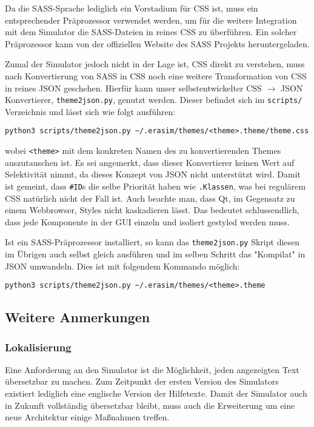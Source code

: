 Da die SASS-Sprache lediglich ein Vorstadium für CSS ist, muss ein
entsprechender Präprozessor verwendet werden, um für die weitere Integration mit
dem Simulator die SASS-Dateien in reines CSS zu überführen. Ein solcher
Präprozessor kann von der offiziellen Website des SASS Projekts heruntergeladen.

Zumal der Simulator jedoch nicht in der Lage ist, CSS direkt zu verstehen, muss
nach Konvertierung von SASS in CSS noch eine weitere Transformation von CSS in
reines JSON geschehen. Hierfür kann unser selbstentwickelter CSS $\rightarrow$
JSON Konvertierer, \texttt{theme2json.py}, genutzt werden. Dieser befindet sich
im \texttt{scripts/} Verzeichnis und lässt sich wie folgt ausführen:

\begin{lstlisting}[emph={python3}]
python3 scripts/theme2json.py ~/.erasim/themes/<theme>.theme/theme.css
\end{lstlisting}

wobei \texttt{<theme>} mit dem konkreten Namen des zu konvertierenden Themes
auszutauschen ist. Es sei angemerkt, dass dieser Konvertierer keinen Wert auf
Selektivität nimmt, da dieses Konzept von JSON nicht unterstützt wird. Damit ist
gemeint, dass \texttt{\#ID}s die selbe Priorität haben wie \texttt{.Klassen},
was bei regulärem CSS natürlich nicht der Fall ist. Auch beachte man, dass Qt,
im Gegensatz zu einem Webbrowser, Styles nicht kaskadieren lässt. Das bedeutet
schlussendlich, dass jede Komponente in der GUI einzeln und isoliert gestyled
werden muss.

Ist ein SASS-Präprozessor installiert, so kann das \texttt{theme2json.py} Skript
diesen im Übrigen auch selbst gleich ausführen und im selben Schritt das
"Kompilat" in JSON umwandeln. Dies ist mit folgendem Kommando möglich:

\begin{lstlisting}[emph={python3}]
python3 scripts/theme2json.py ~/.erasim/themes/<theme>.theme
\end{lstlisting}

 \subsection{Weitere Anmerkungen}

 \subsubsection{Lokalisierung}

 Eine Anforderung an den Simulator ist die Möglichkeit, jeden angezeigten Text
 übersetzbar zu machen. Zum Zeitpunkt der ersten Version des Simulators existiert
 lediglich eine englische Version der Hilfetexte. Damit der Simulator auch in
 Zukunft vollständig übersetzbar bleibt, muss auch die Erweiterung um eine neue
 Architektur einige Maßnahmen treffen.\\


